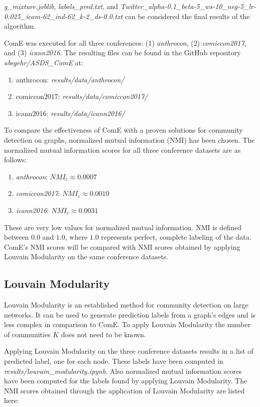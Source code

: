 \documentclass[sigconf]{acmart}
\begin{document}
\textit{g\_mixture.joblib}, \textit{labels\_pred.txt}, and \textit{Twitter\_alpha-0.1\_beta-5\_ws-10\_neg-5\_lr-0.025\_icom-62\_ind-62\_k-2\_ds-0.0.txt} can be considered the final results of the algorithm.

ComE was executed for all three conferences: (1) \textit{anthrocon}, (2) \textit{comiccon2017}, and (3) \textit{icann2016}. The resulting files can be found in the GitHub repository \textit{abegehr/ASDS\_ComE}\cite{asds} at:
\begin{enumerate}
	\item anthrocon: \textit{results/data/anthrocon/}
	\item comiccon2017: \textit{results/data/comiccon2017/}
	\item icann2016: \textit{results/data/icann2016/}
\end{enumerate}

To compare the effectiveness of ComE with a proven solutions for community detection on graphs, normalized mutual information (NMI) has been chosen. The normalized mutual information scores for all three conference datasets are as follows:

\begin{enumerate}
	\item \textit{anthrocon}: $NMI_c \approx 0.0007$
	\item \textit{comiccon2017}: $NMI_c \approx 0.0010$
	\item \textit{icann2016}: $NMI_c \approx 0.0031$
\end{enumerate}

These are very low values for normalized mutual information. NMI is defined between $0.0$ and $1.0$, where $1.0$ represents perfect, complete labeling of the data. ComE's NMI scores will be compared with NMI scores obtained by applying Louvain Modularity on the same conference datasets.

\subsection{Louvain Modularity} \label{apply_lm}

Louvain Modularity is an established method for community detection on large networks. It can be used to generate prediction labels from a graph's edges and is less complex in comparison to ComE. To apply Louvain Modularity the number of communities $K$ does not need to be known.

Applying Louvain Modularity on the three conference datasets results in a list of predicted label, one for each node. These labels have been computed in \textit{results/louvain\_modularity.ipynb}. Also normalized mutual information scores have been computed for the labels found by applying Louvain Modularity. The NMI scores obtained through the application of Louvain Modularity are listed here:
\end{document}
